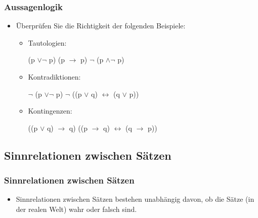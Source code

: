 
\begin{frame}
\frametitle{Aussagenlogik}

\begin{itemize}
	\item Überprüfen Sie die Richtigkeit der folgenden Beispiele:
	
	\vspace{1em}
	
	\begin{itemize}
		\item Tautologien:
	
		\eal
			\ex (p $\lor \lnot$ p)
			\ex (p $\rightarrow$ p)
			\ex $\lnot$ (p $\land \lnot$ p)
		\zl
			
		\item Kontradiktionen:
		
		\eal
			\ex $\lnot$ (p $\lor \lnot$ p)
			\ex $\lnot$ ((p $\lor$ q) $\leftrightarrow$ (q $\lor$ p))
		\zl

		\item Kontingenzen:
		
		\eal
			\ex ((p $\lor$ q) $\rightarrow$ q)
			\ex ((p $\rightarrow$ q) $\leftrightarrow$ (q $\rightarrow$ p))
		\zl
			
	\end{itemize}	
	
\end{itemize}

\end{frame}


\subsection{Sinnrelationen zwischen Sätzen}

\begin{frame}
\frametitle{Sinnrelationen zwischen Sätzen}

\begin{itemize}
	\item Sinnrelationen zwischen Sätzen bestehen unabhängig davon, ob die Sätze (in der realen Welt) wahr oder falsch sind.
\end{itemize}


\end{frame}



